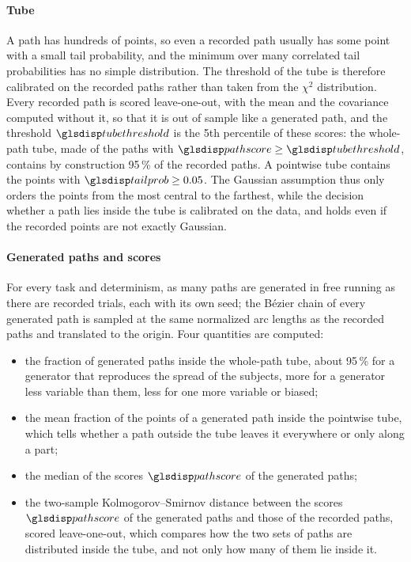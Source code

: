 \documentclass[12pt]{report}
\begin{document}
\paragraph{Tube}
A path has hundreds of points, so even a recorded path usually has some point with a small tail probability, and the minimum over many correlated tail probabilities has no simple distribution. The threshold of the tube is therefore calibrated on the recorded paths rather than taken from the $\chi^2$ distribution. Every recorded path is scored leave-one-out, with the mean and the covariance computed without it, so that it is out of sample like a generated path, and the threshold $\sym{tubethreshold}$ is the 5th percentile of these scores: the whole-path tube, made of the paths with $\sym{pathscore}\ge\sym{tubethreshold}$, contains by construction 95\,\% of the recorded paths. A pointwise tube contains the points with $\sym{tailprob}_{k,m}\ge0.05$. The Gaussian assumption thus only orders the points from the most central to the farthest, while the decision whether a path lies inside the tube is calibrated on the data, and holds even if the recorded points are not exactly Gaussian.

\paragraph{Generated paths and scores}
For every task and determinism, as many paths are generated in free running as there are recorded trials, each with its own seed; the Bézier chain of every generated path is sampled at the same normalized arc lengths as the recorded paths and translated to the origin. Four quantities are computed:
\begin{itemize}
    \item the fraction of generated paths inside the whole-path tube, about 95\,\% for a generator that reproduces the spread of the subjects, more for a generator less variable than them, less for one more variable or biased;
    \item the mean fraction of the points of a generated path inside the pointwise tube, which tells whether a path outside the tube leaves it everywhere or only along a part;
    \item the median of the scores $\sym{pathscore}$ of the generated paths;
    \item the two-sample Kolmogorov--Smirnov distance between the scores $\sym{pathscore}$ of the generated paths and those of the recorded paths, scored leave-one-out, which compares how the two sets of paths are distributed inside the tube, and not only how many of them lie inside it.
\end{itemize}
\end{document}
